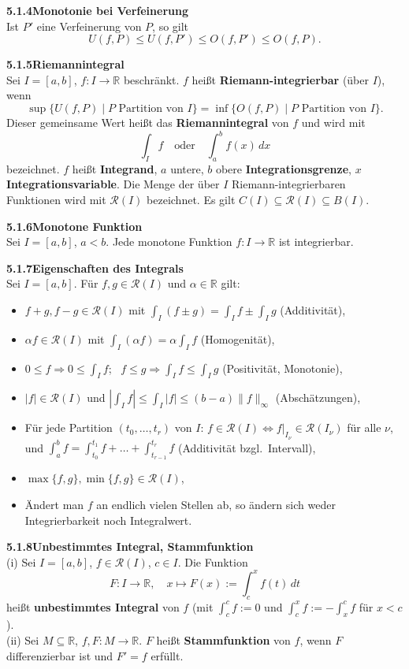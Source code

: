 \documentclass[a4paper,12pt]{article}
\newcommand{\gentry}[3]{%
  \noindent\textbf{#1\quad #2}\nopagebreak\\[0.2em]
  #3\par\smallskip
}
\begin{document}
\gentry{5.1.4}{Monotonie bei Verfeinerung}{%
  Ist $P'$ eine Verfeinerung von $P$, so gilt
  \[
    U(f,P) \leq U(f,P') \leq O(f,P') \leq O(f,P).
  \]
}

\gentry{5.1.5}{Riemannintegral}{%
  Sei $I=[a,b]$, $f: I \to \mathbb{R}$ beschränkt. $f$ heißt
  \textbf{Riemann-integrierbar} (über $I$), wenn
  \[
    \sup\{U(f,P)\mid P \text{ Partition von } I\}
    = \inf\{O(f,P)\mid P \text{ Partition von } I\}.
  \]
  Dieser gemeinsame Wert heißt das \textbf{Riemannintegral} von $f$ und wird mit
  \[
    \int_I f \quad\text{oder}\quad \int_a^b f(x)\,dx
  \]
  bezeichnet. $f$ heißt \textbf{Integrand}, $a$ untere, $b$ obere
  \textbf{Integrationsgrenze}, $x$ \textbf{Integrationsvariable}. Die Menge der
  über $I$ Riemann-integrierbaren Funktionen wird mit $\mathcal{R}(I)$ bezeichnet.
  Es gilt $C(I) \subseteq \mathcal{R}(I) \subseteq B(I)$.
}

\gentry{5.1.6}{Monotone Funktion}{%
  Sei $I=[a,b]$, $a<b$. Jede monotone Funktion $f: I \to \mathbb{R}$ ist
  integrierbar.
}

\gentry{5.1.7}{Eigenschaften des Integrals}{%
  Sei $I=[a,b]$. Für $f, g \in \mathcal{R}(I)$ und $\alpha \in \mathbb{R}$ gilt:
  \begin{itemize}[topsep=2pt,itemsep=1pt]
    \item $f+g, f-g \in \mathcal{R}(I)$ mit $\int_I (f\pm g) = \int_I f \pm \int_I g$ \hfill (Additivität),
    \item $\alpha f \in \mathcal{R}(I)$ mit $\int_I (\alpha f) = \alpha \int_I f$ \hfill (Homogenität),
    \item $0 \leq f \Rightarrow 0 \leq \int_I f$; \ $f \leq g \Rightarrow \int_I f \leq \int_I g$ \hfill (Positivität, Monotonie),
    \item $|f| \in \mathcal{R}(I)$ und $\left|\int_I f\right| \leq \int_I |f| \leq (b-a)\|f\|_\infty$ \hfill (Abschätzungen),
    \item Für jede Partition $(t_0,\ldots,t_r)$ von $I$: $f \in \mathcal{R}(I) \Leftrightarrow f|_{I_\nu} \in \mathcal{R}(I_\nu)$ für alle $\nu$, und
          $\int_a^b f = \int_{t_0}^{t_1} f + \ldots + \int_{t_{r-1}}^{t_r} f$ \hfill (Additivität bzgl.\ Intervall),
    \item $\max\{f,g\}, \min\{f,g\} \in \mathcal{R}(I)$,
    \item Ändert man $f$ an endlich vielen Stellen ab, so ändern sich weder
          Integrierbarkeit noch Integralwert.
  \end{itemize}
}

\gentry{5.1.8}{Unbestimmtes Integral, Stammfunktion}{%
  (i) Sei $I=[a,b]$, $f \in \mathcal{R}(I)$, $c \in I$. Die Funktion
  \[
    F: I \to \mathbb{R}, \quad x \mapsto F(x) := \int_c^x f(t)\,dt
  \]
  heißt \textbf{unbestimmtes Integral} von $f$ (mit $\int_c^c f := 0$ und
  $\int_c^x f := -\int_x^c f$ für $x<c$).\\
  (ii) Sei $M \subseteq \mathbb{R}$, $f, F: M \to \mathbb{R}$. $F$ heißt
  \textbf{Stammfunktion} von $f$, wenn $F$ differenzierbar ist und $F' = f$
  erfüllt.
}
\end{document}
